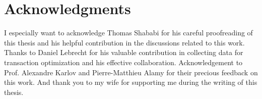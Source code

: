 \chapter*{Acknowledgments}

I especially want to acknowledge Thomas Shababi for his careful proofreading of
this thesis and his helpful contribution in the discussions related to this
work. Thanks to Daniel Lebrecht for his valuable contribution in collecting data
for transaction optimization and his effective collaboration. Acknowledgement to
Prof. Alexandre Karlov and Pierre-Matthieu Alamy for their precious feedback on
this work. And thank you to my wife for supporting me during the writing of this
thesis.
